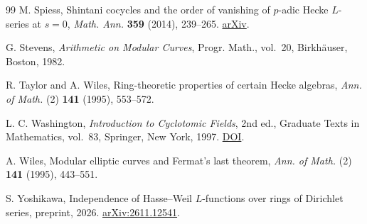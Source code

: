 \documentclass[11pt]{amsart}
\numberwithin{equation}{section}
\theoremstyle{definition}
\theoremstyle{remark}
\begin{document}
\begin{thebibliography}{99}
M. Spiess, Shintani cocycles and the order of vanishing of $p$-adic
Hecke $L$-series at $s=0$,
\emph{Math. Ann.} \textbf{359} (2014), 239--265.
\href{https://arxiv.org/abs/1203.6689}{arXiv}.

G. Stevens, \emph{Arithmetic on Modular Curves},
Progr. Math., vol.~20, Birkh\"auser, Boston, 1982.

R. Taylor and A. Wiles, Ring-theoretic properties of certain Hecke
algebras, \emph{Ann. of Math.} (2) \textbf{141} (1995), 553--572.

L. C. Washington, \emph{Introduction to Cyclotomic Fields}, 2nd ed.,
Graduate Texts in Mathematics, vol.~83, Springer, New York, 1997.
\href{https://doi.org/10.1007/978-1-4612-1934-7}{DOI}.

A. Wiles, Modular elliptic curves and Fermat's last theorem,
\emph{Ann. of Math.} (2) \textbf{141} (1995), 443--551.

S. Yoshikawa, Independence of Hasse--Weil $L$-functions over rings
of Dirichlet series, preprint, 2026.
\href{https://arxiv.org/abs/2611.12541}{arXiv:2611.12541}.

\end{thebibliography}
\end{document}
